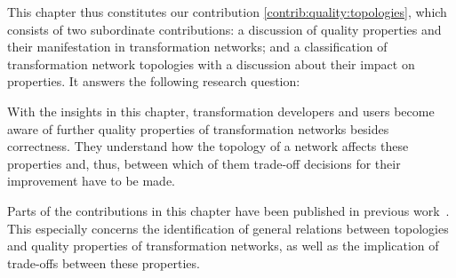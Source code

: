 This chapter thus constitutes our contribution \autoref{contrib:quality:topologies}, which consists of two subordinate contributions: a discussion of quality properties and their manifestation in transformation networks; and a classification of transformation network topologies with a discussion about their impact on properties.
It answers the following research question:


With the insights in this chapter, transformation developers and users become aware of further quality properties of transformation networks besides correctness.
They understand how the topology of a network affects these properties and, thus, between which of them trade-off decisions for their improvement have to be made.

Parts of the contributions in this chapter have been published in previous work~.
This especially concerns the identification of general relations between topologies and quality properties of transformation networks, as well as the implication of trade-offs between these properties.





